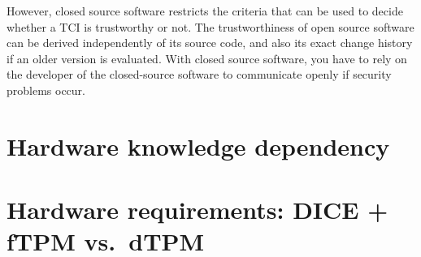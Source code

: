 However, closed source software restricts the criteria that can be used to decide whether a TCI is trustworthy or not.
The trustworthiness of open source software can be derived independently of its source code, and also its exact change history if an older version is evaluated.
With closed source software, you have to rely on the developer of the closed-source software to communicate openly if security problems occur.







\section{Hardware knowledge dependency}



\section{Hardware requirements: DICE + fTPM vs.\ dTPM}

